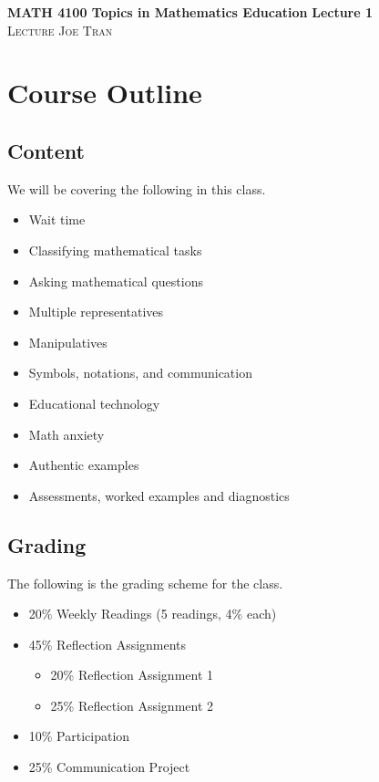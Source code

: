 \documentclass[11pt]{amsart}
\begin{document}
\textbf{MATH 4100 Topics in Mathematics Education} \hfill \textbf{Lecture 1} \\
\textsc{Lecture} \hfill \textsc{Joe Tran}

\section{Course Outline}

\subsection{Content} 

We will be covering the following in this class.
\begin{itemize}
    \item Wait time
    \item Classifying mathematical tasks
    \item Asking mathematical questions
    \item Multiple representatives
    \item Manipulatives
    \item Symbols, notations, and communication
    \item Educational technology
    \item Math anxiety
    \item Authentic examples
    \item Assessments, worked examples and diagnostics
\end{itemize}

\subsection{Grading}

The following is the grading scheme for the class.

\begin{itemize}
    \item 20\% Weekly Readings (5 readings, 4\% each)
    \item 45\% Reflection Assignments
    \begin{itemize}
        \item 20\% Reflection Assignment 1
        \item 25\% Reflection Assignment 2
    \end{itemize}
    \item 10\% Participation
    \item 25\% Communication Project
\end{itemize}
\end{document}
